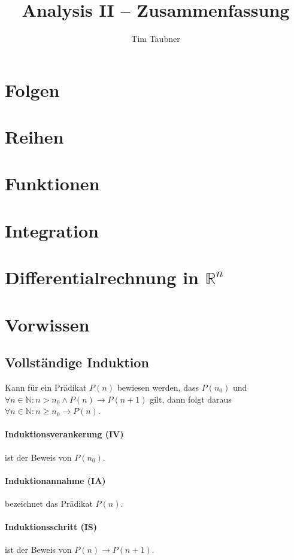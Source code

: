 \documentclass[a4paper, 9pt, DIV=24]{scrartcl}
\title{Analysis II -- Zusammenfassung}
\author{Tim Taubner}
\newcommand{\N}{\mathbb{N}}
\newcommand{\R}{\mathbb{R}}
\begin{document}
\pagestyle{fancy}
\fancyhf{}

\begin{twocolumn}
\tableofcontents
\end{twocolumn}

\section{Folgen}

\section{Reihen}

\section{Funktionen}

\section{Integration}

\section{Differentialrechnung in $\R^n$}


\appendix
\section{Vorwissen}
\subsection{Vollständige Induktion}
Kann für ein Prädikat $P(n)$ bewiesen werden, dass $P(n_0)$ und $\forall n\in\N: n > n_0 \wedge P(n) \rightarrow P(n+1)$ gilt,
dann folgt daraus $\forall n\in\N: n \geq n_0 \rightarrow P(n)$.
\paragraph{Induktionsverankerung (IV)} ist der Beweis von $P(n_0)$.
\paragraph{Induktionannahme (IA)} bezeichnet das Prädikat $P(n)$.
\paragraph{Induktionsschritt (IS)} ist der Beweis von $P(n) \rightarrow P(n+1)$.
\end{document}

